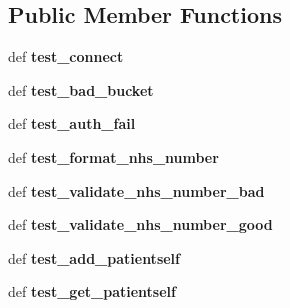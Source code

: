 \subsection*{Public Member Functions}
\begin{DoxyCompactItemize}
\item 
\hypertarget{classtests_1_1test__all_1_1main__test_ad8729afe738cdf76aff8354f210bdd6b}{def {\bfseries test\-\_\-connect}}\label{classtests_1_1test__all_1_1main__test_ad8729afe738cdf76aff8354f210bdd6b}

\item 
\hypertarget{classtests_1_1test__all_1_1main__test_addbbeb92a6c1d386eecc8bd82d5af0b5}{def {\bfseries test\-\_\-bad\-\_\-bucket}}\label{classtests_1_1test__all_1_1main__test_addbbeb92a6c1d386eecc8bd82d5af0b5}

\item 
\hypertarget{classtests_1_1test__all_1_1main__test_a3432ac16715688b3945017784d04e1cd}{def {\bfseries test\-\_\-auth\-\_\-fail}}\label{classtests_1_1test__all_1_1main__test_a3432ac16715688b3945017784d04e1cd}

\item 
\hypertarget{classtests_1_1test__all_1_1main__test_a2742467a305857ed3df5c254636d8838}{def {\bfseries test\-\_\-format\-\_\-nhs\-\_\-number}}\label{classtests_1_1test__all_1_1main__test_a2742467a305857ed3df5c254636d8838}

\item 
\hypertarget{classtests_1_1test__all_1_1main__test_a4c44445e626d5519edff521c078e91e4}{def {\bfseries test\-\_\-validate\-\_\-nhs\-\_\-number\-\_\-bad}}\label{classtests_1_1test__all_1_1main__test_a4c44445e626d5519edff521c078e91e4}

\item 
\hypertarget{classtests_1_1test__all_1_1main__test_a015e951e742ccf8b3794250ec2321914}{def {\bfseries test\-\_\-validate\-\_\-nhs\-\_\-number\-\_\-good}}\label{classtests_1_1test__all_1_1main__test_a015e951e742ccf8b3794250ec2321914}

\item 
\hypertarget{classtests_1_1test__all_1_1main__test_ac7c9badd5a0e5e988637624089bf471d}{def {\bfseries test\-\_\-add\-\_\-patientself}}\label{classtests_1_1test__all_1_1main__test_ac7c9badd5a0e5e988637624089bf471d}

\item 
\hypertarget{classtests_1_1test__all_1_1main__test_ad0cabcd246dc3e4ad755ea7abcb86093}{def {\bfseries test\-\_\-get\-\_\-patientself}}\label{classtests_1_1test__all_1_1main__test_ad0cabcd246dc3e4ad755ea7abcb86093}


\end{DoxyCompactItemize}
